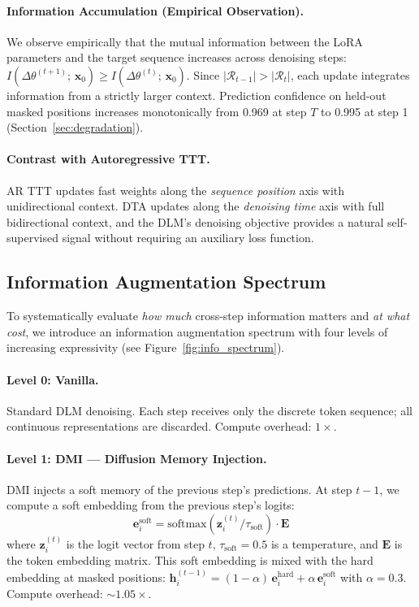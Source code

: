 \documentclass{article}
\begin{document}
\paragraph{Information Accumulation (Empirical Observation).}
We observe empirically that the mutual information between the LoRA parameters and the target sequence increases across denoising steps:
$I(\Delta\theta^{(t+1)};\, \mathbf{x}_0) \geq I(\Delta\theta^{(t)};\, \mathbf{x}_0)$.
Since $|\mathcal{R}_{t-1}| > |\mathcal{R}_t|$, each update integrates information from a strictly larger context. Prediction confidence on held-out masked positions increases monotonically from 0.969 at step $T$ to 0.995 at step 1 (Section~\ref{sec:degradation}).

\paragraph{Contrast with Autoregressive TTT.}
AR TTT \citep{sun2024ttt, behrouz2025titans} updates fast weights along the \emph{sequence position} axis with unidirectional context. DTA updates along the \emph{denoising time} axis with full bidirectional context, and the DLM's denoising objective provides a natural self-supervised signal without requiring an auxiliary loss function.

\subsection{Information Augmentation Spectrum}
\label{sec:spectrum}

To systematically evaluate \emph{how much} cross-step information matters and \emph{at what cost}, we introduce an information augmentation spectrum with four levels of increasing expressivity (see Figure~\ref{fig:info_spectrum}).

\paragraph{Level 0: Vanilla.} Standard DLM denoising. Each step receives only the discrete token sequence; all continuous representations are discarded. Compute overhead: $1{\times}$.

\paragraph{Level 1: DMI --- Diffusion Memory Injection.}
DMI injects a soft memory of the previous step's predictions. At step $t{-}1$, we compute a soft embedding from the previous step's logits:
\begin{equation}
\mathbf{e}_i^{\text{soft}} = \text{softmax}(\mathbf{z}_i^{(t)} / \tau_{\text{soft}}) \cdot \mathbf{E}
\end{equation}
where $\mathbf{z}_i^{(t)}$ is the logit vector from step $t$, $\tau_{\text{soft}} = 0.5$ is a temperature, and $\mathbf{E}$ is the token embedding matrix. This soft embedding is mixed with the hard embedding at masked positions:
$\mathbf{h}_i^{(t-1)} = (1 - \alpha)\, \mathbf{e}_i^{\text{hard}} + \alpha\, \mathbf{e}_i^{\text{soft}}$
with $\alpha = 0.3$. Compute overhead: ${\sim}1.05{\times}$.
\end{document}
